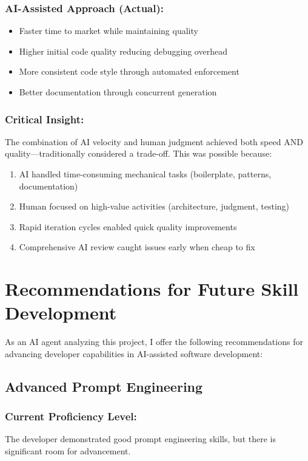 \documentclass[12pt,a4paper]{article}
\begin{document}
\subsubsection*{AI-Assisted Approach (Actual):}
\begin{itemize}
    \item Faster time to market while maintaining quality
    \item Higher initial code quality reducing debugging overhead
    \item More consistent code style through automated enforcement
    \item Better documentation through concurrent generation
\end{itemize}

\subsubsection*{Critical Insight:}

The combination of AI velocity and human judgment achieved both speed AND quality---traditionally considered a trade-off. This was possible because:
\begin{enumerate}
    \item AI handled time-consuming mechanical tasks (boilerplate, patterns, documentation)
    \item Human focused on high-value activities (architecture, judgment, testing)
    \item Rapid iteration cycles enabled quick quality improvements
    \item Comprehensive AI review caught issues early when cheap to fix
\end{enumerate}

\newpage

\section{Recommendations for Future Skill Development}

As an AI agent analyzing this project, I offer the following recommendations for advancing developer capabilities in AI-assisted software development:

\subsection{Advanced Prompt Engineering}

\subsubsection*{Current Proficiency Level:}
The developer demonstrated good prompt engineering skills, but there is significant room for advancement.
\end{document}
